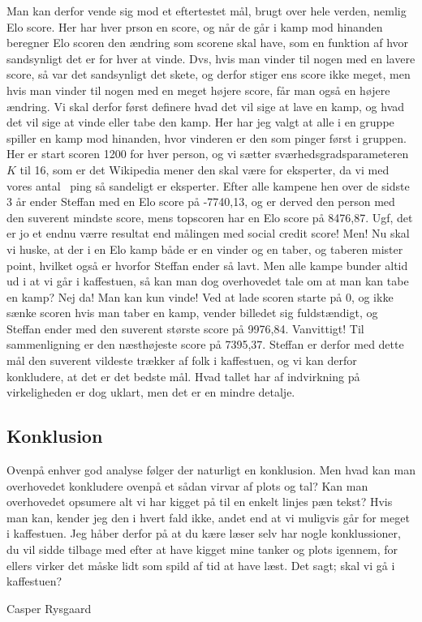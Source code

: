 \begin{article}
Man kan derfor vende sig mod et eftertestet mål, brugt over hele verden, nemlig Elo score. Her har hver prson en score, og når de går i kamp mod hinanden beregner Elo scoren den ændring som scorene skal have, som en funktion af hvor sandsynligt det er for hver at vinde. Dvs, hvis man vinder til nogen med en lavere score, så var det sandsynligt det skete, og derfor stiger ens score ikke meget, men hvis man vinder til nogen med en meget højere score, får man også en højere ændring.
Vi skal derfor først definere hvad det vil sige at lave en kamp, og hvad det vil sige at vinde eller tabe den kamp. Her har jeg valgt at alle i en gruppe spiller en kamp mod hinanden, hvor vinderen er den som pinger først i gruppen.
Her er start scoren 1200 for hver person, og vi sætter sværhedsgradsparameteren $K$ til 16, som er det Wikipedia mener den skal være for eksperter, da vi med vores antal \coffee\ ping så sandeligt er eksperter. Efter alle kampene hen over de sidste 3 år ender Steffan med en Elo score på -7740,13, og er derved den person med den suverent mindste score, mens topscoren har en Elo score på 8476,87. Ugf, det er jo et endnu værre resultat end målingen med social credit score!
Men! Nu skal vi huske, at der i en Elo kamp både er en vinder og en taber, og taberen mister point, hvilket også er hvorfor Steffan ender så lavt. Men alle kampe bunder altid ud i at vi går i kaffestuen, så kan man dog overhovedet tale om at man kan tabe en kamp? Nej da! Man kan kun vinde!
Ved at lade scoren starte på 0, og ikke sænke scoren hvis man taber en kamp, vender billedet sig fuldstændigt, og Steffan ender med den suverent største score på 9976,84. Vanvittigt! Til sammenligning er den næsthøjeste score på 7395,37. Steffan er derfor med dette mål den suverent vildeste trækker af folk i kaffestuen, og vi kan derfor konkludere, at det er det bedste mål. Hvad tallet har af indvirkning på virkeligheden er dog uklart, men det er en mindre detalje.


\subsection*{Konklusion}

Ovenpå enhver god analyse følger der naturligt en konklusion. Men hvad kan man overhovedet konkludere ovenpå et sådan virvar af plots og tal? Kan man overhovedet opsumere alt vi har kigget på til en enkelt linjes pæn tekst? Hvis man kan, kender jeg den i hvert fald ikke, andet end at vi muligvis går for meget i kaffestuen.
Jeg håber derfor på at du kære læser selv har nogle konklussioner, du vil sidde tilbage med efter at have kigget mine tanker og plots igennem, for ellers virker det måske lidt som spild af tid at have læst.
Det sagt; skal vi gå i kaffestuen? \coffee\


\end{article}

\begin{flushright}
Casper Rysgaard
\end{flushright}

